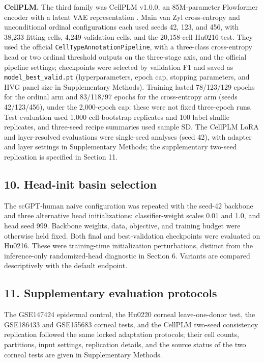 \documentclass[12pt,letterpaper]{article}
\begin{document}
\textbf{CellPLM.} The third family was CellPLM v1.0.0, an 85M-parameter Flowformer encoder with a latent VAE representation \cite{wen2024cellplm}. Main van Zyl cross-entropy and unconditional ordinal configurations each used seeds 42, 123, and 456, with 38,233 fitting cells, 4,249 validation cells, and the 20,158-cell Hu0216 test. They used the official \texttt{CellTypeAnnotationPipeline}, with a three-class cross-entropy head or two ordinal threshold outputs on the three-stage axis, and the official pipeline settings; checkpoints were selected by validation F1 and saved as \texttt{model\_\allowbreak best\_\allowbreak valid.pt} (hyperparameters, epoch cap, stopping parameters, and HVG panel size in Supplementary Methods). Training lasted 78/123/129 epochs for the ordinal arm and 83/118/97 epochs for the cross-entropy arm (seeds 42/123/456), under the 2,000-epoch cap; these were not fixed three-epoch runs. Test evaluation used 1,000 cell-bootstrap replicates and 100 label-shuffle replicates, and three-seed recipe summaries used sample SD. The CellPLM LoRA and layer-resolved evaluations were single-seed analyses (seed 42), with adapter and layer settings in Supplementary Methods; the supplementary two-seed replication is specified in Section 11.

\subsection*{10. Head-init basin selection}

The scGPT-human naive configuration was repeated with the seed-42 backbone and three alternative head initializations: classifier-weight scales 0.01 and 1.0, and head seed 999. Backbone weights, data, objective, and training budget were otherwise held fixed. Both final and best-validation checkpoints were evaluated on Hu0216. These were training-time initialization perturbations, distinct from the inference-only randomized-head diagnostic in Section 6. Variants are compared descriptively with the default endpoint.

\subsection*{11. Supplementary evaluation protocols}

The GSE147424 epidermal control, the Hu0220 corneal leave-one-donor test, the GSE186433 and GSE155683 corneal tests, and the CellPLM two-seed consistency replication followed the same locked adaptation protocols; their cell counts, partitions, input settings, replication details, and the source status of the two corneal tests are given in Supplementary Methods.
\end{document}
